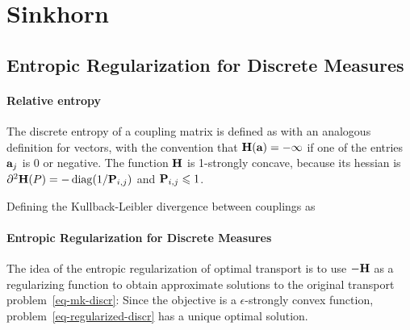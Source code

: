 

\section{Sinkhorn}

\subsection{Entropic Regularization for Discrete Measures}


\paragraph{Relative entropy}

The discrete entropy of a coupling matrix is defined as
with an analogous definition for vectors, with the convention that $\HD(\a) = -\infty$ if one of the entries $\a_j$ is 0 or negative. The function $\HD$ is 1-strongly concave, because its hessian is $\partial^2 \HD(P)=-\diag(1/\P_{i,j})$ and $\P_{i,j} \leq 1$. 


Defining the Kullback-Leibler divergence between couplings as


\paragraph{Entropic Regularization for Discrete Measures}

The idea of the entropic regularization of optimal transport is to use $-\HD$ as a regularizing function to obtain approximate solutions to the original transport problem~\eqref{eq-mk-discr}:
Since the objective is a $\epsilon$-strongly convex function, problem~\ref{eq-regularized-discr} has a unique optimal solution. 


